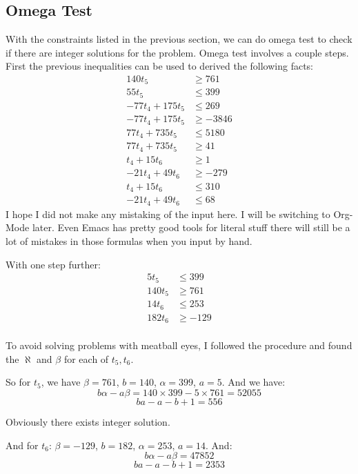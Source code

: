 \documentclass[12pt]{article}
\begin{document}
\subsection{Omega Test}
With the constraints listed in the previous section, we can do omega
test to check if there are integer solutions for the problem. Omega
test involves a couple steps. First  the previous inequalities can be
used to derived the following facts:
\begin{equation}
  \begin{aligned}
    140t_5&\ge 761\\
    55t_5&\le 399\\
    -77t_4+175t_5&\le 269\\
    -77t_4+175t_5&\ge -3846\\
    77t_4+735t_5&\le 5180\\
    77t_4+735t_5&\ge 41 \\
    t_4+15t_6&\ge 1\\
    -21t_4+49t_6&\ge -279\\
    t_4 + 15t_6&\le 310\\
    -21t_4+ 49t_6&\le 68
  \end{aligned}
\end{equation}
I hope I did not make any mistaking of the input here. I will be
switching to Org-Mode later. Even Emacs has pretty good tools for
literal stuff there will still be a lot of mistakes in those formulas
when you input by hand.

With one step further:
\begin{equation}
  \begin{aligned}
    5t_5& \le 399 \\
    140t_5& \ge 761\\
    14t_6&\le 253\\
    182t_6&\ge -129\\
  \end{aligned}
\end{equation}

To avoid solving problems with meatball eyes, I followed the procedure
and found the $\aleph$ and $\beta$ for each of $t_5, t_6$. 

So for $t_5$, we have $\beta=761$, $b = 140$, $\alpha=399$, $a=5$. And
we have:
$$b\alpha - a\beta=140\times 399 - 5\times 761 = 52055$$
$$ba-a-b+1 = 556$$

Obviously there exists integer solution.

And for $t_6$:  $\beta=-129$, $b = 182$, $\alpha=253$, $a=14$. And:
$$b\alpha - a\beta = 47852$$
$$ba-a-b+1 = 2353$$
\end{document}
